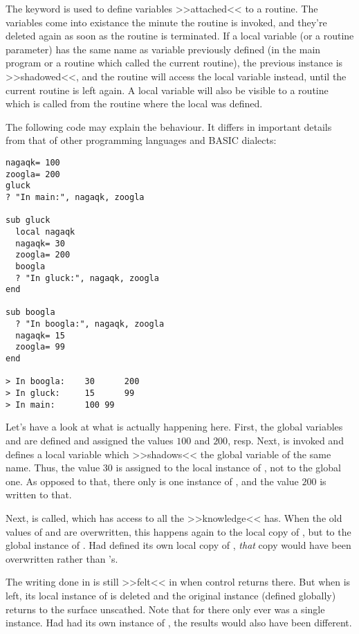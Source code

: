 The keyword  is used to define variables >>attached<< to
a routine.  The variables come into existance the
minute the routine is invoked, and they're deleted again as soon as the
routine is terminated. If a local variable (or a routine parameter) has
the same name as variable previously defined (in the main program or a
routine which called the current routine), the previous instance is
>>shadowed<<, and the routine will access the local variable instead,
until the current routine is left again. A local variable will also be
visible to a routine which is called from the routine where the local
was defined.

The following code may explain the behaviour. It differs in important
details from that of other programming languages and BASIC dialects:

\begin{lstlisting}
nagaqk= 100
zoogla= 200
gluck
? "In main:", nagaqk, zoogla

sub gluck
  local nagaqk
  nagaqk= 30
  zoogla= 200
  boogla
  ? "In gluck:", nagaqk, zoogla
end

sub boogla
  ? "In boogla:", nagaqk, zoogla
  nagaqk= 15
  zoogla= 99
end

> In boogla:	30		200
> In gluck:		15		99
> In main:		100	99
\end{lstlisting}

Let's have a look at what is actually happening here. First, the global
variables  and  are defined and assigned the
values $100$ and $200$, resp. Next,  is invoked and defines a
local variable  which >>shadows<< the global variable of the
same name. Thus, the value $30$ is assigned to the local instance of
, not to the global one. As opposed to that, there only is
one instance of , and the value $200$ is written to that.

Next,  is called, which has access to all the >>knowledge<<
 has. When the old values of  and  are
overwritten, this happens again to the local copy of , but to
the global instance of . Had  defined its own
local copy of , \emph{that} copy would have been overwritten
rather than 's.

The writing done in  is still >>felt<< in  when
control returns there. But when  is left, its local instance
of  is deleted and the original instance (defined globally)
returns to the surface unscathed. Note that for  there only
ever was a single instance. Had  had its own instance of
, the results would also have been different.

